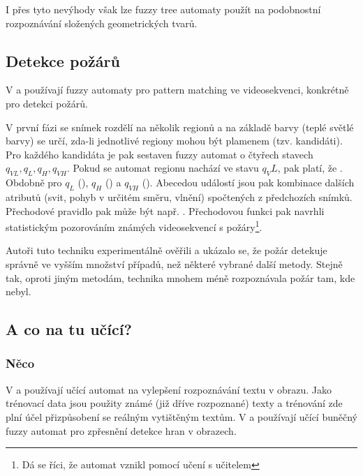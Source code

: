 \documentclass[a4paper,10pt]{article}
\begin{document}
I přes tyto nevýhody však lze fuzzy tree automaty použít na podobnostní rozpoznávání složených geometrických tvarů.




\subsection{Detekce požárů}
V \cite{HamKoNam-FirFlaDetBasFuzFinAut} a \cite{KoHamNam-ModForFuFiAuDetIrrFirFla} používají fuzzy automaty pro pattern matching ve videosekvenci, konkrétně pro detekci požárů.

V první fázi se snímek rozdělí na několik regionů a na základě barvy (teplé světlé barvy) se určí, zda-li jednotlivé regiony mohou být plamenem (tzv. kandidáti). Pro každého kandidáta je pak sestaven fuzzy automat o čtyřech stavech $q_{VL}, q_{L}, q_{H}, q_{VH}$. Pokud se automat regionu nachází ve stavu $q_VL$, pak platí, že . Obdobně pro $q_{L}$ (), $q_{H}$ () a $q_{VH}$ (). Abecedou událostí jsou pak kombinace dalších atributů (svit, pohyb v určitém směru, vlnění) spočtených z předchozích snímků. Přechodové pravidlo pak může být např. . Přechodovou funkci pak navrhli statistickým pozorováním známých videosekvencí s požáry\footnote{Dá se říci, že automat vznikl pomocí učení s učitelem}.

Autoři tuto techniku experimentálně ověřili a ukázalo se, že požár detekuje správně ve vyšším množství případů, než některé vybrané další metody. Stejně tak, oproti jiným metodám, technika mnohem méně rozpoznávala požár tam, kde nebyl.


\subsection{A co na tu učící?}
\subsubsection{Něco}
V \cite{AstGariGonVillFar-ApprStrMatUsiDefFuzzAutLearExpr} a \cite{WeeFu-FormFuzAutAppModLeaSys} používají učící automat na vylepšení rozpoznávání textu v obrazu. Jako trénovací data jsou použity známé (již dříve rozpoznané) texty a trénování zde plní účel přizpůsobení se reálným vytištěným textům. V \cite{PatMor-EdgDetTecFuzzLogCEllLeaAutFuzzImPro} a \cite{SinGha+HybrEdgDetMetFuzSetTheCelLeaAut} používají učící buněčný fuzzy automat pro zpřesnění detekce hran v obrazech. 






\end{document}
